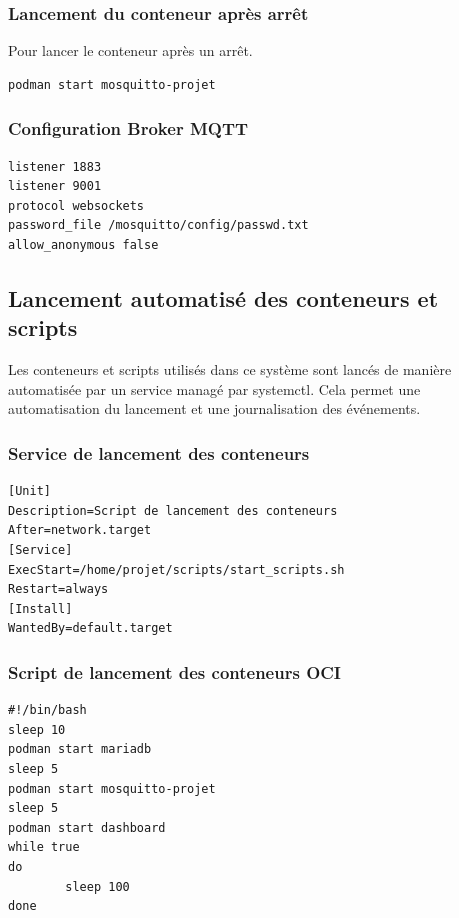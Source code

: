 \documentclass[a4paper,11pt]{article}
\begin{document}
        \subsubsection{Lancement du conteneur après arrêt}
        Pour lancer le conteneur après un arrêt.
        \begin{lstlisting}[style=bash, caption={Lancement du conteneur après un arrêt}]
podman start mosquitto-projet
        \end{lstlisting}

        \subsubsection{Configuration Broker MQTT}
        \begin{lstlisting}[style=bash, caption={Configuration du broker MQTT}]
listener 1883
listener 9001
protocol websockets
password_file /mosquitto/config/passwd.txt
allow_anonymous false
        \end{lstlisting}
        \newpage

        \subsection{Lancement automatisé des conteneurs et scripts}
        Les conteneurs et scripts utilisés dans ce système sont lancés de manière automatisée par un service managé par systemctl. Cela permet  une automatisation du lancement et une journalisation des événements.
        \subsubsection{Service de lancement des conteneurs}
        \begin{lstlisting}[style=bash, caption={Fichier de configuration du service systemctl de lancement des conteneurs OCI}]
[Unit]
Description=Script de lancement des conteneurs
After=network.target
[Service]
ExecStart=/home/projet/scripts/start_scripts.sh
Restart=always
[Install]
WantedBy=default.target
        \end{lstlisting}

        \subsubsection{Script de lancement des conteneurs OCI}
        \begin{lstlisting}[style=bash, caption={Script de lancement des conteneurs OCI}]
#!/bin/bash
sleep 10
podman start mariadb
sleep 5
podman start mosquitto-projet
sleep 5
podman start dashboard
while true
do
        sleep 100
done
        \end{lstlisting}
\end{document}
